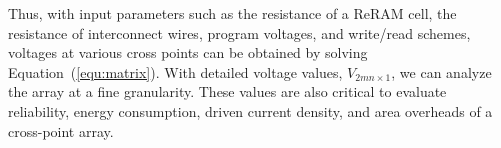 
Thus, with input parameters such as the resistance of a ReRAM cell, the
resistance of interconnect wires, program voltages, and write/read
schemes, voltages at various cross points can be obtained by solving
Equation~(\ref{equ:matrix}). With detailed voltage values,
$V_{2mn{\times}1}$, we can analyze the array at a fine granularity. These
values are also critical to evaluate reliability, energy consumption,
driven current density, and area overheads of a cross-point array.
